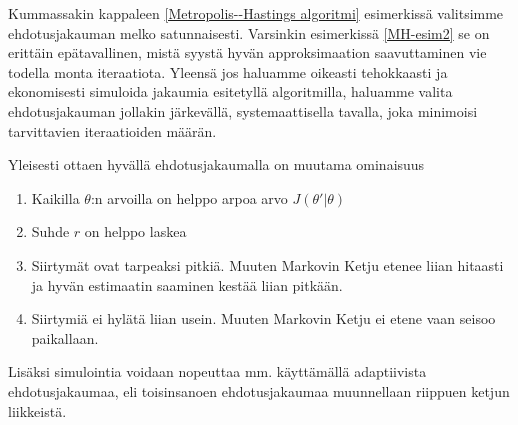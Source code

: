 Kummassakin kappaleen \ref{Metropolis--Hastings algoritmi} esimerkissä valitsimme ehdotusjakauman melko satunnaisesti. Varsinkin esimerkissä \ref{MH-esim2} se on erittäin epätavallinen, mistä syystä hyvän approksimaation saavuttaminen vie todella monta iteraatiota. Yleensä jos haluamme oikeasti tehokkaasti ja ekonomisesti simuloida jakaumia esitetyllä algoritmilla, haluamme valita ehdotusjakauman jollakin järkevällä, systemaattisella tavalla, joka minimoisi tarvittavien iteraatioiden määrän.

Yleisesti ottaen hyvällä ehdotusjakaumalla on muutama ominaisuus\cite{gelman_andrew_bayesian_nodate}
\begin{enumerate}
	\item Kaikilla $\theta$:n arvoilla on helppo arpoa arvo $J(\theta'|\theta)$
	\item Suhde $r$ on helppo laskea
	\item Siirtymät ovat tarpeaksi pitkiä. Muuten Markovin Ketju etenee liian hitaasti ja hyvän estimaatin saaminen kestää liian pitkään.
	\item Siirtymiä ei hylätä liian usein. Muuten Markovin Ketju ei etene vaan seisoo paikallaan.
\end{enumerate}

Lisäksi simulointia voidaan nopeuttaa mm. käyttämällä adaptiivista ehdotusjakaumaa, eli toisinsanoen ehdotusjakaumaa muunnellaan riippuen ketjun liikkeistä. 

















